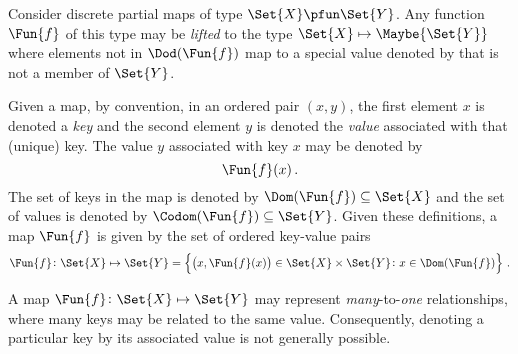 \documentclass[ ../main.tex]{subfiles}
\begin{document}
Consider discrete partial maps of type $\Set{X} \pfun \Set{Y}$.
Any function $\Fun{f}$ of this type may be \emph{lifted} to the type $\Set{X} \mapsto \Maybe{\Set{Y}}$ where elements not in $\Dod(\Fun{f})$ map to a special value denoted by \Nothing that is not a member of $\Set{Y}$.




Given a map, by convention, in an ordered pair $(x, y)$, the first element $x$ is denoted a \emph{key} and the second element $y$ is denoted the \emph{value} associated with that (unique) key. The value $y$ associated with key $x$ may be denoted by
\begin{equation}
\Fun{f}(x)\,.
\end{equation}
The set of keys in the map is denoted by $\Dom(\Fun{f}) \subseteq \Set{X}$ and the set of values is denoted by $\Codom(\Fun{f}) \subseteq \Set{Y}$. Given these definitions, a map $\Fun{f}$ is given by the set of ordered key-value pairs
\begin{equation}
\Fun{f} \colon \Set{X} \mapsto \Set{Y} = \left\{
\left(x, \Fun{f}(x)\right) \in \Set{X} \times \Set{Y} \colon x \in \Dom(\Fun{f})
\right\}\,.
\end{equation}

A map $\Fun{f} \colon \Set{X} \mapsto \Set{Y}$ may represent \emph{many}-to-\emph{one} relationships, where many keys may be related to the same value. Consequently, denoting a particular key by its associated value is not generally possible.
\end{document}
